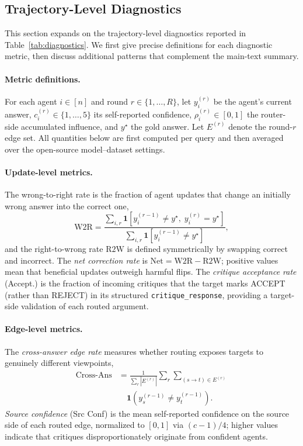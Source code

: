 \subsection{Trajectory-Level Diagnostics}
\label{app:diagnostics}

This section expands on the trajectory-level diagnostics reported in Table~\ref{tab:diagnostics}. We first give precise definitions for each diagnostic metric, then discuss additional patterns that complement the main-text summary.
 
\paragraph{Metric definitions.}
 
For each agent $i\in[n]$ and round $r\in\{1,\ldots,R\}$, let $y_i^{(r)}$ be the agent's current answer, $c_i^{(r)}\in\{1,\ldots,5\}$ its self-reported confidence, $\rho_i^{(r)}\in[0,1]$ the router-side accumulated influence, and $y^\star$ the gold answer. Let $E^{(r)}$ denote the round-$r$ edge set. All quantities below are first computed per query and then averaged over the open-source model--dataset settings.
 
\paragraph{Update-level metrics.}
The wrong-to-right rate is the fraction of agent updates that change an initially wrong answer into the correct one,
\begin{equation*}
    \mathrm{W2R}=\frac{\sum_{i,r}\mathbf{1}\!\left[y_i^{(r-1)}\!\neq\! y^\star,\;y_i^{(r)}\!=\!y^\star\right]}{\sum_{i,r}\mathbf{1}\!\left[y_i^{(r-1)}\!\neq\! y^\star\right]},
\end{equation*}
and the right-to-wrong rate $\mathrm{R2W}$ is defined symmetrically by swapping correct and incorrect. The \emph{net correction rate} is $\mathrm{Net}=\mathrm{W2R}-\mathrm{R2W}$; positive values mean that beneficial updates outweigh harmful flips. The \emph{critique acceptance rate} (Accept.) is the fraction of incoming critiques that the target marks ACCEPT (rather than REJECT) in its structured \texttt{critique\_response}, providing a target-side validation of each routed argument.
 
\paragraph{Edge-level metrics.}
The \emph{cross-answer edge rate} measures whether routing exposes targets to genuinely different viewpoints,
\begin{align*}
\mathrm{Cross\text{-}Ans}
&=
\frac{1}{\sum_r |E^{(r)}|}
\sum_r
\sum_{(s \to t)\in E^{(r)}} \\
&\quad
\mathbf{1}
\!\left(
y_s^{(r-1)}
\neq
y_t^{(r-1)}
\right).
\end{align*}
\emph{Source confidence} (Src Conf) is the mean self-reported confidence on the source side of each routed edge, normalized to $[0,1]$ via $(c-1)/4$; higher values indicate that critiques disproportionately originate from confident agents.
 
